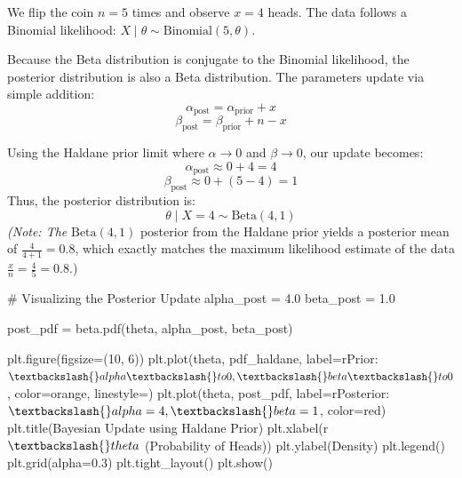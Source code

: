 \documentclass[
  letterpaper,
  DIV=11,
  numbers=noendperiod]{scrartcl}
\newenvironment{Shaded}{\begin{snugshade}}{\end{snugshade}}
\newcommand{\CommentTok}[1]{\textcolor[rgb]{0.37,0.37,0.37}{#1}}
\newcommand{\DecValTok}[1]{\textcolor[rgb]{0.68,0.00,0.00}{#1}}
\newcommand{\FloatTok}[1]{\textcolor[rgb]{0.68,0.00,0.00}{#1}}
\newcommand{\NormalTok}[1]{\textcolor[rgb]{0.00,0.23,0.31}{#1}}
\newcommand{\OperatorTok}[1]{\textcolor[rgb]{0.37,0.37,0.37}{#1}}
\newcommand{\StringTok}[1]{\textcolor[rgb]{0.13,0.47,0.30}{#1}}
\newcommand{\VerbatimStringTok}[1]{\textcolor[rgb]{0.13,0.47,0.30}{#1}}
\begin{document}
We flip the coin \(n = 5\) times and observe \(x = 4\) heads. The data
follows a Binomial likelihood:
\(X \mid \theta \sim \text{Binomial}(5, \theta)\).

Because the Beta distribution is conjugate to the Binomial likelihood,
the posterior distribution is also a Beta distribution. The parameters
update via simple addition: \[
\alpha_{\text{post}} = \alpha_{\text{prior}} + x 
\] \[
\beta_{\text{post}} = \beta_{\text{prior}} + n - x
\]

Using the Haldane prior limit where \(\alpha \to 0\) and
\(\beta \to 0\), our update becomes: \[
\alpha_{\text{post}} \approx 0 + 4 = 4
\] \[
\beta_{\text{post}} \approx 0 + (5 - 4) = 1
\] Thus, the posterior distribution is: \[
\theta \mid X = 4 \sim \text{Beta}(4, 1)
\] \emph{(Note: The} \(\text{Beta}(4, 1)\) posterior from the Haldane
prior yields a posterior mean of \(\frac{4}{4+1} = 0.8\), which exactly
matches the maximum likelihood estimate of the data
\(\frac{x}{n} = \frac{4}{5} = 0.8\).)

\begin{Shaded}
\begin{Highlighting}[]
\CommentTok{\# Visualizing the Posterior Update}
\NormalTok{alpha\_post }\OperatorTok{=} \FloatTok{4.0}
\NormalTok{beta\_post }\OperatorTok{=} \FloatTok{1.0}

\NormalTok{post\_pdf }\OperatorTok{=}\NormalTok{ beta.pdf(theta, alpha\_post, beta\_post)}

\NormalTok{plt.figure(figsize}\OperatorTok{=}\NormalTok{(}\DecValTok{10}\NormalTok{, }\DecValTok{6}\NormalTok{))}
\NormalTok{plt.plot(theta,}
\NormalTok{         pdf\_haldane,}
\NormalTok{         label}\OperatorTok{=}\VerbatimStringTok{r\textquotesingle{}Prior: $\textbackslash{}alpha \textbackslash{}to 0, \textbackslash{}beta \textbackslash{}to 0$\textquotesingle{}}\NormalTok{,}
\NormalTok{         color}\OperatorTok{=}\StringTok{\textquotesingle{}orange\textquotesingle{}}\NormalTok{,}
\NormalTok{         linestyle}\OperatorTok{=}\StringTok{\textquotesingle{}{-}{-}\textquotesingle{}}\NormalTok{)}
\NormalTok{plt.plot(theta,}
\NormalTok{         post\_pdf,}
\NormalTok{         label}\OperatorTok{=}\VerbatimStringTok{r\textquotesingle{}Posterior: $\textbackslash{}alpha=4, \textbackslash{}beta=1$\textquotesingle{}}\NormalTok{,}
\NormalTok{         color}\OperatorTok{=}\StringTok{\textquotesingle{}red\textquotesingle{}}\NormalTok{)}
\NormalTok{plt.title(}\StringTok{\textquotesingle{}Bayesian Update using Haldane Prior\textquotesingle{}}\NormalTok{)}
\NormalTok{plt.xlabel(}\VerbatimStringTok{r\textquotesingle{}$\textbackslash{}theta$ (Probability of Heads)\textquotesingle{}}\NormalTok{)}
\NormalTok{plt.ylabel(}\StringTok{\textquotesingle{}Density\textquotesingle{}}\NormalTok{)}
\NormalTok{plt.legend()}
\NormalTok{plt.grid(alpha}\OperatorTok{=}\FloatTok{0.3}\NormalTok{)}
\NormalTok{plt.tight\_layout()}
\NormalTok{plt.show()}
\end{Highlighting}
\end{Shaded}
\end{document}

